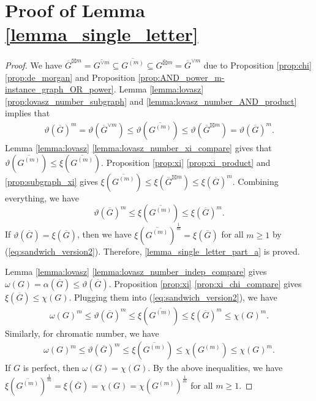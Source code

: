 \documentclass[journal, onecolumn, draftcls]{IEEEtran}
\theoremstyle{definition}
\begin{document}
\section{Proof of Lemma \ref{lemma_single_letter}}\label{app:proof_lemma_single_letter}
\begin{proof}
We have $\overline{G}^{\boxtimes m}= \overline{G^{\lor m}}\subseteq \overline{G^{(m)}}\subseteq \overline{G^{\boxtimes m}} =\overline{G}^{\lor m}$ due to Proposition \ref{prop:chi} \ref{prop:de_morgan} and Proposition \ref{prop:AND_power_m-instance_graph_OR_power}. Lemma \ref{lemma:lovasz} \ref{prop:lovasz_number_subgraph} and   \ref{lemma:lovasz_number_AND_product} implies that 
\begin{align*}
\vartheta(\overline{G})^m = \vartheta(\overline{G}^{\lor m}) \le  \vartheta(\overline {G^{(m)}})\le \vartheta(\overline{G}^{\boxtimes  m}) = \vartheta(\overline{G})^m.
\end{align*}
Lemma \ref{lemma:lovasz} \ref{lemma:lovasz_number_xi_compare} gives that $\vartheta(\overline {G^{(m)}})\le\xi(\overline {G^{(m)}})$.  Proposition \ref{prop:xi}     \ref{prop:xi_product} and \ref{prop:subgraph_xi} gives $\xi(\overline {G^{(m)}}) \le\xi(\overline{G}^{\boxtimes m})  \le  \xi(\overline {G})^{m}$. Combining everything, we have
\begin{equation}
    \vartheta(\overline{G})^m\le \xi(\overline {G^{(m)}}) \le  \xi(\overline {G})^{m}.\label{eq:sandwich_version2}    
\end{equation}
If $\vartheta(\overline{G})=\xi(\overline {G})$, then we have $\xi(\overline {G^{(m)}})^{\frac{1}{m}}=\xi(\overline {G})$ for all $m\ge 1$ by  (\ref{eq:sandwich_version2}). Therefore, \ref{lemma_single_letter_part_a} is proved. 

Lemma \ref{lemma:lovasz} \ref{lemma:lovasz_number_indep_compare} gives $\omega(G) = \alpha(\overline{G}) \le \vartheta(\overline{G})$. Proposition \ref{prop:xi} \ref{prop:xi_chi_compare} gives $\xi(\overline {G})\le \chi(G)$. Plugging them into   (\ref{eq:sandwich_version2}), we have
\begin{align*}
 \omega(G)^m   \le \vartheta(\overline{G})^m\le \xi(\overline {G^{(m)}}) \le  \xi(\overline {G})^{m}   \le \chi(G)^m.
\end{align*}
Similarly, for chromatic number, we have
\begin{align*}
 \omega(G)^m   \le \vartheta(\overline{G})^m\le \xi(\overline {G^{(m)}}) {\le}  \chi( {G^{(m)}})    \le \chi(G)^m.
\end{align*}
If $G$ is perfect, then $ \omega(G) = \chi(G)$. By the above inequalities, we have $\xi(\overline {G^{(m)}})^{\frac{1}{m}}=\xi(\overline {G})=\chi(G)=\chi( {G^{(m)}})^{\frac{1}{m}}$ for all $m\ge 1$.  
\end{proof}
 
\end{document}
